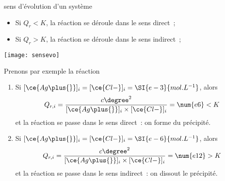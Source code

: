 \documentclass[../main/main.tex]{subfiles}
\begin{document}
\begin{prop}[label=prop:qrsensevo]{sens d'évolution d'un système}
    \begin{itemize}
        \item Si $Q_r < K$, la réaction se déroule dans le sens direct~;
        \item Si $Q_r > K$, la réaction se déroule dans le sens indirect~;
    \end{itemize}
    \begin{center}
        \texttt{[image: sensevo]}
    \end{center}
\end{prop}

Prenons par exemple la réaction


\begin{enumerate}
    \item Si $[\ce{Ag\plus{}}]_i = [\ce{Cl-}]_i = \SI{e-3}{mol.L^{-1}}$, alors
        \[Q_{r,i} = \frac{c\degree^2}{[\ce{Ag\plus{}}]_i \times [\ce{Cl-}]_i}
            = \num{e6} < K\]
        et la réaction se passe dans le sens direct~: on forme du précipité.
    \item Si $[\ce{Ag\plus{}}]_i = [\ce{Cl-}]_i = \SI{e-6}{mol.L^{-1}}$, alors
        \[Q_{r,i} = \frac{c\degree^2}{[\ce{Ag\plus{}}]_i \times [\ce{Cl-}]_i}
            = \num{e12} > K\]
        et la réaction se passe dans le sens indirect~: on dissout le précipité.
\end{enumerate}
\end{document}
